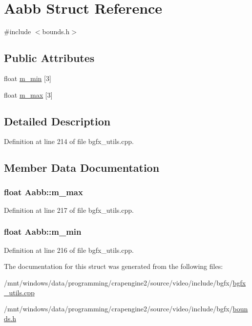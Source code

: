 \hypertarget{struct_aabb}{\section{Aabb Struct Reference}
\label{struct_aabb}
}


{\ttfamily \#include $<$bounds.\+h$>$}

\subsection*{Public Attributes}
\begin{DoxyCompactItemize}
\item 
float \hyperlink{struct_aabb_ad61e0decc079ad0e8e4e3fdd27f8f553}{m\+\_\+min} \mbox{[}3\mbox{]}
\item 
float \hyperlink{struct_aabb_a94ddc0be28fc2d4443883f51c6b75b2f}{m\+\_\+max} \mbox{[}3\mbox{]}
\end{DoxyCompactItemize}


\subsection{Detailed Description}


Definition at line 214 of file bgfx\+\_\+utils.\+cpp.



\subsection{Member Data Documentation}
\hypertarget{struct_aabb_a94ddc0be28fc2d4443883f51c6b75b2f}{
\subsubsection[{m\+\_\+max}]{\setlength{\rightskip}{0pt plus 5cm}float Aabb\+::m\+\_\+max}}\label{struct_aabb_a94ddc0be28fc2d4443883f51c6b75b2f}


Definition at line 217 of file bgfx\+\_\+utils.\+cpp.

\hypertarget{struct_aabb_ad61e0decc079ad0e8e4e3fdd27f8f553}{
\subsubsection[{m\+\_\+min}]{\setlength{\rightskip}{0pt plus 5cm}float Aabb\+::m\+\_\+min}}\label{struct_aabb_ad61e0decc079ad0e8e4e3fdd27f8f553}


Definition at line 216 of file bgfx\+\_\+utils.\+cpp.



The documentation for this struct was generated from the following files\+:\begin{DoxyCompactItemize}
\item 
/mnt/windows/data/programming/crapengine2/source/video/include/bgfx/\hyperlink{bgfx__utils_8cpp}{bgfx\+\_\+utils.\+cpp}\item 
/mnt/windows/data/programming/crapengine2/source/video/include/bgfx/\hyperlink{bounds_8h}{bounds.\+h}\end{DoxyCompactItemize}
